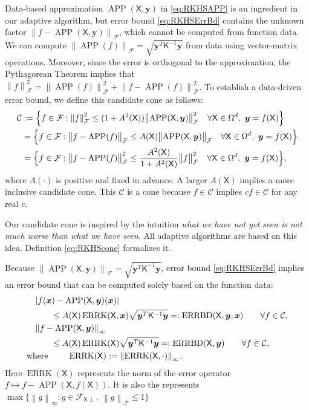 \documentclass[]{mcom-l}
\theoremstyle{theorem}
\theoremstyle{remark}
\DeclareMathOperator{\errK}{ERRK}
\DeclareMathOperator{\errBd}{ERRBD}
\DeclareMathOperator{\APP}{APP}
\newcommand{\mK}{\mathsf{K}}
\newcommand{\mX}{\mathsf{X}}
\newcommand{\bx}{{\boldsymbol{x}}}
\newcommand{\by}{{\boldsymbol{y}}}
\newcommand{\calc}{{\mathcal{C}}}
\newcommand{\calf}{{\mathcal{F}}}
\def\abs#1{\ensuremath{\left \lvert #1 \right \rvert}}
\newcommand{\norm}[2][{}]{\ensuremath{\left \lVert #2 \right \rVert}_{#1}}
\newcommand{\bignorm}[2][{}]{\ensuremath{\bigl \lVert #2 \bigr \rVert}_{#1}}
\begin{document}
Data-based approximation $\APP(\mX,\by)$ in \eqref{eq:RKHSAPP} is an ingredient in our adaptive algorithm, but error bound \eqref{eq:RKHSErrBd} contains the unknown factor $\norm[\calf]{f - \APP(\mX,\by)}$, which cannot be computed from function data.  We can compute  $\bignorm[\calf]{\APP(f)} = \sqrt{\by^T \mK^{-1} \by}$ from data using vector-matrix operations.  Moreover, since the error is orthogonal to the approximation,  the Pythagorean Theorem implies that $\norm[\calf]{f}^2  = \bignorm[\calf]{\APP(f)}^2 + \bignorm[\calf]{f - \APP(f)}^2$.  To establish a data-driven error bound, we define this candidate cone as follows:
\begin{align} \label{eq:RKHScone}
\calc &:= \Bigl\{f \in \calf : \norm[\calf]{f}^2 \le (1 + A^2(\mX)) \bignorm[\calf]{\APP(\mX,\by)}^2 \quad \forall \mX \in \Omega^d, \ \by = f(\mX) \Bigr \} \\
\nonumber
& = \Bigl \{f \in \calf : \bignorm[\calf]{f - \APP(f)} \le A(\mX) \bignorm[\calf]{\APP(\mX,\by)} \quad \forall \mX \in \Omega^d, \ \by = f(\mX) \Bigr \} \\
\nonumber
& = \Bigl \{f \in \calf : \bignorm[\calf]{f - \APP(f)}^2 \le \frac{A^2(\mX)}{1 + A^2(\mX)} \bignorm[\calf]{f}^2 \quad \forall \mX \in \Omega^d, \ \by = f(\mX) \Bigr \},
\end{align}
where $A(\cdot)$ is positive and fixed in advance.  A larger $A(\mX)$ implies a more inclusive candidate cone.  This $\calc$ is a cone because $f \in \calc$ implies $c f \in \calc$ for any real $c$. 

Our candidate cone is inspired by the intuition \emph{what we have not yet seen is not much worse than what we have seen}. All adaptive algorithms are based on this idea. Definition \eqref{eq:RKHScone} formalizes it. 

Because $\bignorm[\calf]{\APP(\mX,\by)} = \sqrt{\by^T \mK^{-1} \by}$, error bound \eqref{eq:RKHSErrBd} implies an error bound that can be computed solely based on the function data: 
\begin{subequations} \label{eq:DataErrBd}
\begin{align}
\label{eq:DataErrBdA}
    \MoveEqLeft\abs{f(\bx) - \APP(\mX,\by)(\bx)} \\
    \nonumber
    & \le   A(\mX) \errK(\mX,\bx) \sqrt{\by^T \mK^{-1} \by } =: \errBd(\mX,\by,\bx) \qquad \forall f \in \calc, \\
    \label{eq:DataErrBdB}
    \MoveEqLeft\norm[\infty]{f - \APP(\mX,\by)} \\ 
    \nonumber 
    & \le   A(\mX) \errK(\mX) \sqrt{\by^T \mK^{-1} \by } =: \errBd(\mX,\by) \qquad \forall f \in \calc, \\
    \text{where }& \qquad \errK(\mX) := \norm[\infty]{\errK(\mX,\cdot)}.
\end{align}
\end{subequations}
Here $\errK(\mX)$ represents the norm of the error operator $f \mapsto f-\APP(\mX,f(\mX))$.  It is also the represents $\max \{\norm[\infty]{g} : g \in \calf_{\mX \perp}, \ \norm[\calf]{g} \le 1\}$
\end{document}
